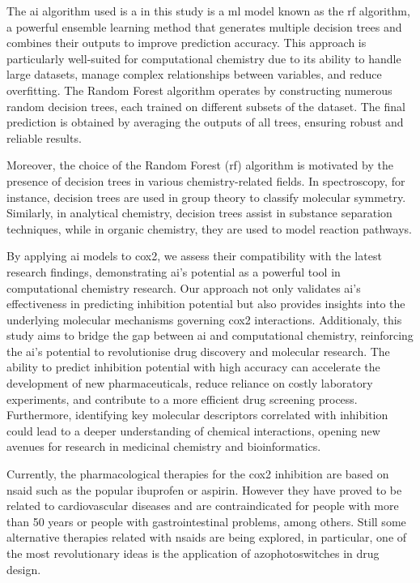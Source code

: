 \documentclass[11pt]{article}
\begin{document}
The \gls{ai} algorithm used is a in this study is a \gls{ml} model known as the \gls{rf} algorithm\cite{MachineLearningRandomForest}\cite{UAB_ComputationalChemistry}, a powerful ensemble learning method that generates multiple decision trees and combines their outputs to improve prediction accuracy. This approach is particularly well-suited for computational chemistry due to its ability to handle large datasets, manage complex relationships between variables, and reduce overfitting. The Random Forest algorithm operates by constructing numerous random decision trees, each trained on different subsets of the dataset. The final prediction is obtained by averaging the outputs of all trees, ensuring robust and reliable results.

Moreover, the choice of the Random Forest (\gls{rf}) algorithm is motivated by the presence of decision trees in various chemistry-related fields. In spectroscopy, for instance, decision trees are used in group theory to classify molecular symmetry. Similarly, in analytical chemistry, decision trees assist in substance separation techniques, while in organic chemistry, they are used to model reaction pathways.

By applying \gls{ai} models to \gls{cox2}, we assess their compatibility with the latest research findings\cite{Cox2InhibitorsReview}, demonstrating \gls{ai}’s potential as a powerful tool in computational chemistry research. Our approach not only validates \gls{ai}’s effectiveness in predicting inhibition potential but also provides insights into the underlying molecular mechanisms governing \gls{cox2} interactions. Additionaly, this study aims to bridge the gap between \gls{ai} and computational chemistry, reinforcing the \gls{ai}’s potential to revolutionise drug discovery and molecular research. The ability to predict inhibition potential with high accuracy can accelerate the development of new pharmaceuticals, reduce reliance on costly laboratory experiments, and contribute to a more efficient drug screening process. Furthermore, identifying key molecular descriptors correlated with inhibition could lead to a deeper understanding of chemical interactions, opening new avenues for research in medicinal chemistry and bioinformatics.

Currently, the pharmacological therapies for the \gls{cox2} inhibition are based on \gls{nsaid}\cite{nsaidDefinition} such as the popular ibuprofen or aspirin. However they have proved to be related to cardiovascular diseases and are contraindicated for people with more than 50 years or people with gastrointestinal problems, among others. Still some alternative therapies related with \gls{nsaid}s are being explored, in particular, one of the most revolutionary ideas is the application of azophotoswitches in drug design.
\end{document}
